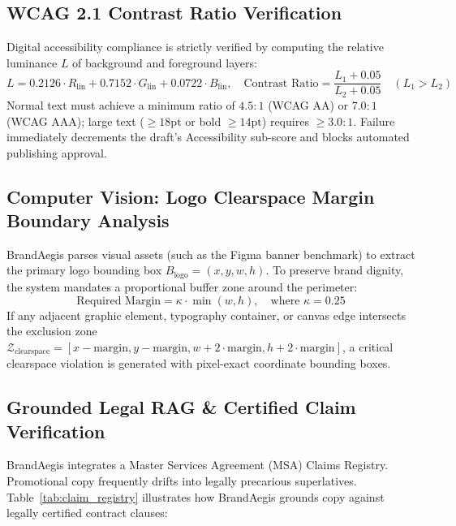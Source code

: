 \documentclass[10pt,a4paper]{article}
\begin{document}
\subsection{WCAG 2.1 Contrast Ratio Verification}
Digital accessibility compliance is strictly verified by computing the relative luminance $L$ of background and foreground layers:
\begin{equation}
L = 0.2126 \cdot R_{\text{lin}} + 0.7152 \cdot G_{\text{lin}} + 0.0722 \cdot B_{\text{lin}}, \quad
\text{Contrast Ratio} = \frac{L_1 + 0.05}{L_2 + 0.05} \quad (L_1 > L_2)
\end{equation}
Normal text must achieve a minimum ratio of $4.5:1$ (WCAG AA) or $7.0:1$ (WCAG AAA); large text ($\ge 18\text{pt}$ or bold $\ge 14\text{pt}$) requires $\ge 3.0:1$. Failure immediately decrements the draft's Accessibility sub-score and blocks automated publishing approval.

\subsection{Computer Vision: Logo Clearspace Margin Boundary Analysis}
BrandAegis parses visual assets (such as the Figma banner benchmark) to extract the primary logo bounding box $B_{\text{logo}} = (x, y, w, h)$. To preserve brand dignity, the system mandates a proportional buffer zone around the perimeter:
\begin{equation}
\text{Required Margin} = \kappa \cdot \min(w, h), \quad \text{where } \kappa = 0.25
\end{equation}
If any adjacent graphic element, typography container, or canvas edge intersects the exclusion zone $\mathcal{Z}_{\text{clearspace}} = [x - \text{margin}, y - \text{margin}, w + 2\cdot\text{margin}, h + 2\cdot\text{margin}]$, a critical clearspace violation is generated with pixel-exact coordinate bounding boxes.

\subsection{Grounded Legal RAG \& Certified Claim Verification}
BrandAegis integrates a Master Services Agreement (MSA) Claims Registry. Promotional copy frequently drifts into legally precarious superlatives. Table~\ref{tab:claim_registry} illustrates how BrandAegis grounds copy against legally certified contract clauses:
\end{document}
